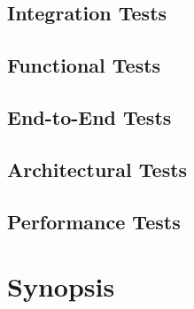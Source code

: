 \subsection{Integration Tests}
\label{subsec:implementation:tests:integration}

\subsection{Functional Tests}
\label{subsec:implementation:tests:functional}

\subsection{End-to-End Tests}
\label{subsec:implementation:tests:endtoend}

\subsection{Architectural Tests}
\label{subsec:implementation:tests:arch}

\subsection{Performance Tests}
\label{subsec:implementation:tests:performance}

\section{Synopsis}
\label{sec:implementation:synopsis}

